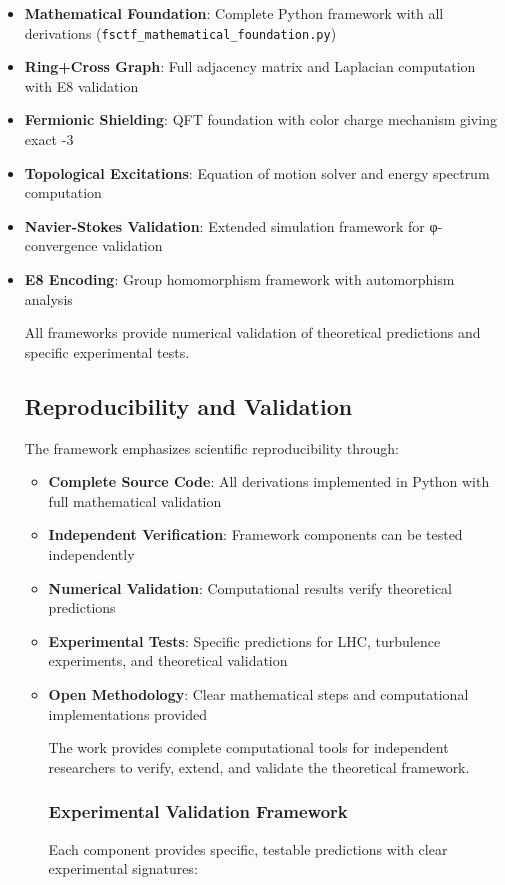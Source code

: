 \documentclass[12pt,a4paper]{article}
\begin{document}
\begin{itemize}
\item \textbf{Mathematical Foundation}: Complete Python framework with all derivations (\texttt{fsctf\_mathematical\_foundation.py})
\item \textbf{Ring+Cross Graph}: Full adjacency matrix and Laplacian computation with E8 validation
\item \textbf{Fermionic Shielding}: QFT foundation with color charge mechanism giving exact -3
\item \textbf{Topological Excitations}: Equation of motion solver and energy spectrum computation
\item \textbf{Navier-Stokes Validation}: Extended simulation framework for φ-convergence validation
\item \textbf{E8 Encoding}: Group homomorphism framework with automorphism analysis

All frameworks provide numerical validation of theoretical predictions and specific experimental tests.

\subsection{Reproducibility and Validation}

The framework emphasizes scientific reproducibility through:

\begin{itemize}
\item \textbf{Complete Source Code}: All derivations implemented in Python with full mathematical validation
\item \textbf{Independent Verification}: Framework components can be tested independently
\item \textbf{Numerical Validation}: Computational results verify theoretical predictions
\item \textbf{Experimental Tests}: Specific predictions for LHC, turbulence experiments, and theoretical validation
\item \textbf{Open Methodology}: Clear mathematical steps and computational implementations provided

The work provides complete computational tools for independent researchers to verify, extend, and validate the theoretical framework.

\subsubsection{Experimental Validation Framework}
Each component provides specific, testable predictions with clear experimental signatures:


\end{itemize}
\end{itemize}
\end{document}
